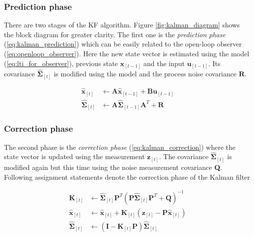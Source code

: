 \subsubsection{Prediction phase}

There are two stages of the KF algorithm. Figure \ref{fig:kalman_diagram} shows the block diagram for greater clarity. The first one is the \textit{prediction phase} (\ref{eq:kalman_prediction}) which can be easily related to the open-loop observer (\ref{eq:openloop_observer}). Here the new state vector is estimated using the model (\ref{eq:lti_for_observer}), previous state $\textbf{\^x}_{[t-1]}$ and the input $\textbf{u}_{[t-1]}$. Its covariance $\hat{\boldsymbol{\Sigma}}_{[t]}$ is modified using the model and the process noise covariance $\textbf{R}$.

\begin{equation}
\begin{split}
\hat{\textbf{x}}_{[t]} &\leftarrow \textbf{A}\hat{\textbf{x}}_{[t-1]} + \textbf{B}\textbf{u}_{[t-1]} \\
\hat{\boldsymbol{\Sigma}}_{[t]} &\leftarrow \textbf{A}\hat{\boldsymbol{\Sigma}}_{[t-1]}\textbf{A}^{T} + \textbf{R}
\end{split}
\label{eq:kalman_prediction}
\end{equation}    

\subsubsection{Correction phase}
The second phase is the \textit{correction phase} (\ref{eq:kalman_correction}) where the state vector is updated using the measurement $\textbf{z}_{[t]}$. The covariance $\hat{\boldsymbol{\Sigma}}_{[t]}$ is modified again but this time using the noise measurement covariance \textbf{Q}. Following assignment statements denote the correction phase of the Kalman filter

\begin{equation}
\begin{split}
\textbf{K}_{[t]} &\leftarrow \hat{\boldsymbol{\Sigma}}_{[t]}\textbf{P}^{T}\left(\textbf{P}\hat{\boldsymbol{\Sigma}}_{[t]}\textbf{P}^{T} + \textbf{Q}\right)^{-1} \\
\hat{\textbf{x}}_{[t]} &\leftarrow \hat{\textbf{x}}_{[t]} + \textbf{K}_{[t]}\left(\textbf{z}_{[t]} - \textbf{P}\hat{\textbf{x}}_{[t]}\right) \\
\hat{\boldsymbol{\Sigma}}_{[t]} &\leftarrow \left(\mathbf{I} - \textbf{K}_{[t]}\textbf{P}\right)\hat{\boldsymbol{\Sigma}}_{[t]}
\end{split}
\label{eq:kalman_correction}
\end{equation}

